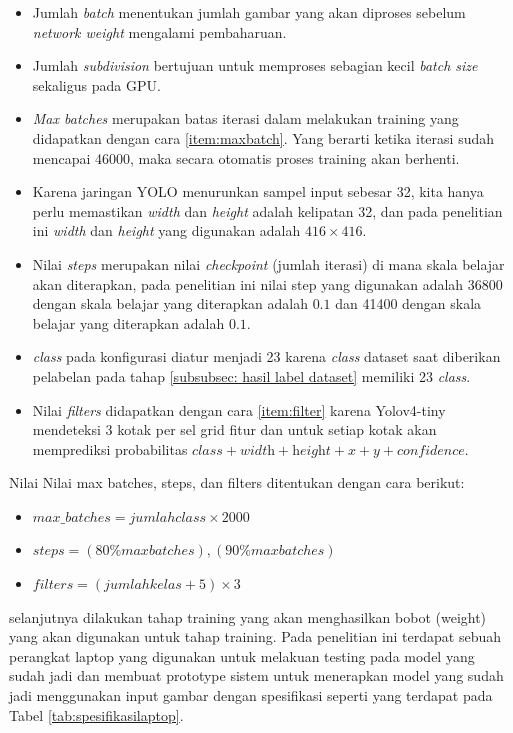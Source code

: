 \begin{itemize}
	\item Jumlah \textit{batch} menentukan jumlah gambar yang akan diproses sebelum \textit{network weight} mengalami pembaharuan.
	\item Jumlah \textit{subdivision} bertujuan untuk memproses sebagian
	kecil \textit{batch size} sekaligus pada GPU.
	\item \textit{Max batches} merupakan batas iterasi dalam melakukan training yang didapatkan dengan cara \ref{item:maxbatch}. Yang berarti ketika iterasi sudah mencapai 46000, maka secara otomatis proses training akan berhenti.
	\item Karena jaringan YOLO menurunkan sampel input sebesar 32, kita hanya perlu memastikan \textit{width} dan \textit{height} adalah kelipatan 32, dan pada penelitian ini \textit{width} dan \textit{height} yang digunakan adalah $416 \times 416$.
	\item Nilai \textit{steps} merupakan nilai \textit{checkpoint} (jumlah iterasi) di mana skala belajar akan diterapkan, pada penelitian ini nilai step yang digunakan adalah 36800 dengan skala belajar yang diterapkan adalah $0.1$ dan 41400 dengan skala belajar yang diterapkan adalah $0.1$.
	\item \textit{class} pada konfigurasi diatur menjadi 23 karena \textit{class} dataset saat diberikan pelabelan pada tahap \ref{subsubsec: hasil label dataset} memiliki 23 \textit{class}.
	\item Nilai \textit{filters} didapatkan dengan cara \ref{item:filter} karena Yolov4-tiny mendeteksi 3 kotak per sel grid fitur dan untuk setiap kotak akan memprediksi probabilitas $\textit{class} + \textit{width} + \textit{height} + x + y + \textit{confidence}$.
\end{itemize}
Nilai   Nilai max batches, steps, dan filters ditentukan dengan cara berikut:
\begin{itemize}
	\item $max\_batches = jumlahclass \times  2000$ \label{item:maxbatch}
	\item $steps = (80\%max batches), (90\%max batches)$
	\item $filters = (jumlahkelas + 5) \times 3$ \label{item:filter}
\end{itemize}
selanjutnya dilakukan tahap training yang akan menghasilkan bobot (weight) yang akan digunakan untuk tahap training. Pada penelitian ini terdapat sebuah perangkat laptop yang digunakan untuk melakuan testing pada model yang sudah jadi 
dan membuat prototype sistem untuk menerapkan model yang sudah jadi menggunakan input gambar dengan spesifikasi seperti yang terdapat pada Tabel \ref{tab:spesifikasilaptop}.

